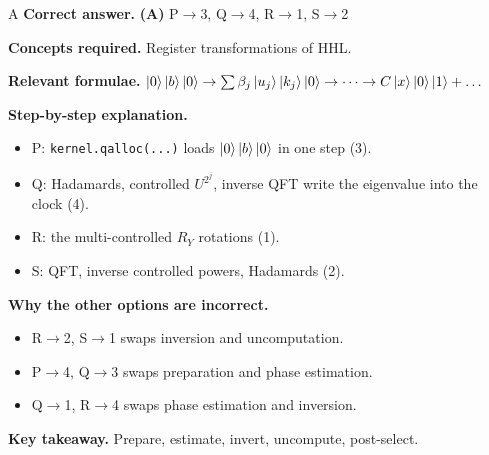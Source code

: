\documentclass[11pt,a4paper]{article}
\newcommand{\qsep}{\par\vspace{2pt}{\color{black!15}\hrule}\vspace{4pt}}
\begin{document}
\begin{solbox}{A}
\textbf{\color{brand}Correct answer.} \textcolor{okgreen}{\textbf{(A)}} P$\to$3, Q$\to$4, R$\to$1, S$\to$2

\textbf{\color{brand}Concepts required.} Register transformations of HHL.

\textbf{\color{brand}Relevant formulae.} $\ket0\ket b\ket0 \to \sum\beta_j\ket{u_j}\ket{k_j}\ket0 \to \dots \to C\ket x\ket0\ket1 + \dots$

\textbf{\color{brand}Step-by-step explanation.} \begin{itemize}\itemsep0pt
\item P: \texttt{kernel.qalloc(...)} loads $\ket0\ket b\ket0$ in one step (3).
\item Q: Hadamards, controlled $U^{2^j}$, inverse QFT write the eigenvalue into the clock (4).
\item R: the multi-controlled $R_Y$ rotations (1).
\item S: QFT, inverse controlled powers, Hadamards (2).
\end{itemize}

\textbf{\color{brand}Why the other options are incorrect.}
\begin{itemize}[leftmargin=2.4em, itemsep=1pt, topsep=2pt]
\item[\textbf{(B)}] R$\to$2, S$\to$1 swaps inversion and uncomputation.
\item[\textbf{(C)}] P$\to$4, Q$\to$3 swaps preparation and phase estimation.
\item[\textbf{(D)}] Q$\to$1, R$\to$4 swaps phase estimation and inversion.
\end{itemize}
\textbf{\color{brand}Key takeaway.} Prepare, estimate, invert, uncompute, post-select.
\end{solbox}
\qsep
\end{document}
